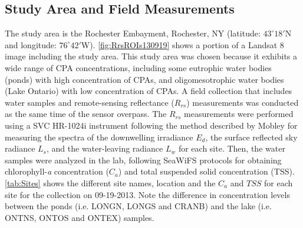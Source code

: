 \documentclass[draft]{spie}  %
\begin{document}
\subsection{Study Area and Field Measurements}

The study area is the Rochester Embayment, Rochester, NY (latitude: $43^\circ18'$N and longitude: $76^\circ42'$W). \autoref{fig:RrsROIs130919} shows a portion of a Landsat 8 image including the study area. This study area was chosen because it exhibits a wide range of CPA concentrations, including some eutrophic water bodies (ponds) with high concentration of CPAs, and oligomesotrophic water bodies (Lake Ontario) with low concentration of CPAs. A field collection that includes water samples and remote-sensing reflectance ($R_{rs}$) measurements was conducted as the same time of the sensor overpass. The $R_{rs}$ measurements were performed using a SVC HR-1024i instrument\cite{SVCHR1024i} following the method described by Mobley\cite{Mobley:1999} for measuring the spectra of the downwelling irradiance $E_d$, the surface reflected sky radiance $L_s$, and the water-leaving radiance $L_w$ for each site. Then, the water samples were analyzed in the lab, following SeaWiFS protocols\cite{Mueller1995} for obtaining chlorophyll-{\it a} concentration ($C_a$) and total suspended solid concentration (TSS). \autoref{tab:Sites} shows the different site names, location and the $C_a$ and $TSS$ for each site for the collection on 09-19-2013. Note the difference in concentration levels between the ponds (i.e. LONGN, LONGS and CRANB) and the lake (i.e. ONTNS, ONTOS and ONTEX) samples.

\end{document}
